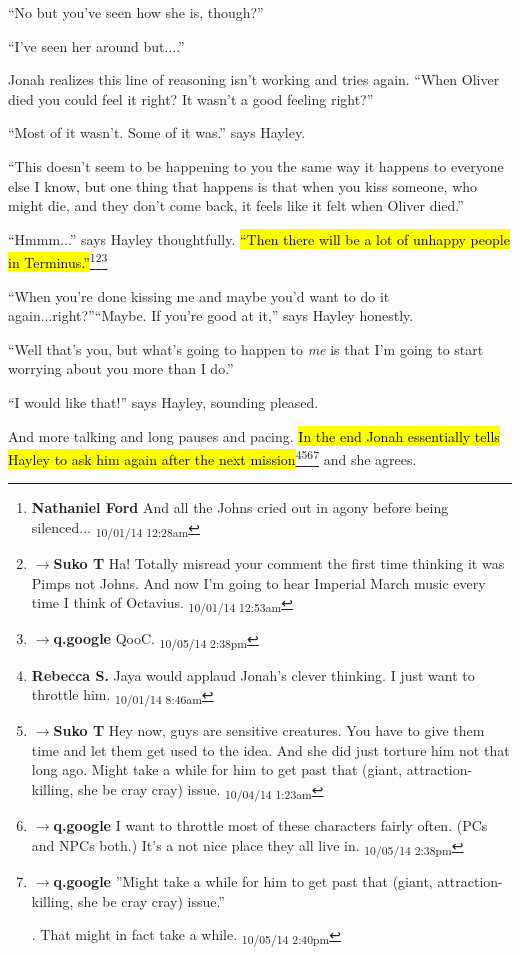 ``No but you've seen how she is, though?''

``I've seen her around but....''

Jonah realizes this line of reasoning isn't working and tries again.  ``When Oliver died you could feel it right?  It wasn't a good feeling right?''

``Most of it wasn't.  Some of it was.'' says Hayley.

``This doesn't seem to be happening to you the same way it happens to everyone else I know, but one thing that happens is that when you kiss someone, who might die, and they don't come back, it feels like it felt when Oliver died.''

``Hmmm...'' says Hayley thoughtfully.  \hl{``Then there will be a lot of unhappy people in Terminus.''}\footnote{\textbf{Nathaniel Ford }And all the Johns cried out in agony before being silenced... \textsubscript{10/01/14 12:28am}}\footnote{$\rightarrow$\textbf{Suko T }Ha!  Totally misread your comment the first time thinking it was Pimps not Johns.  And now I'm going to hear Imperial March music every time I think of Octavius. \textsubscript{10/01/14 12:53am}}\footnote{$\rightarrow$\textbf{q.google }QooC. \textsubscript{10/05/14 2:38pm}}

``When you're done kissing me and maybe you'd want to do it again...right?''``Maybe.  If you're good at it,'' says Hayley honestly.

``Well that's you, but what's going to happen to \textit{me} is that I'm going to start worrying about you more than I do.''

``I would like that!'' says Hayley, sounding pleased.

And more talking and long pauses and pacing.   \hl{In the end Jonah essentially tells Hayley to ask him again after the next mission}\footnote{\textbf{Rebecca S. }Jaya would applaud Jonah's clever thinking.  I just want to throttle him. \textsubscript{10/01/14 8:46am}}\footnote{$\rightarrow$\textbf{Suko T }Hey now, guys are sensitive creatures. You have to give them time and let them get used to the idea.  And she did just torture him not that long ago.  Might take a while for him to get past that (giant, attraction-killing, she be cray cray) issue. \textsubscript{10/04/14 1:23am}}\footnote{$\rightarrow$\textbf{q.google }I want to throttle most of these characters fairly often.  (PCs and NPCs both.)  It's a not nice place they all live in. \textsubscript{10/05/14 2:38pm}}\footnote{$\rightarrow$\textbf{q.google }''Might take a while for him to get past that (giant, attraction-killing, she be cray cray) issue.''

.  That might in fact take a while. \textsubscript{10/05/14 2:40pm}} and she agrees.





